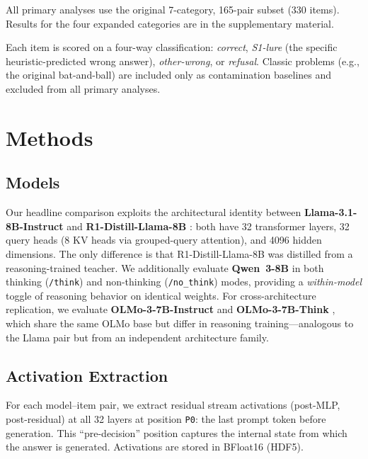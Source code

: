 \documentclass[accepted]{article}
\newcommand{\pzero}{\texttt{P0}}
\begin{document}
\noindent All primary analyses use the original 7-category,
165-pair subset (330 items).  Results for the four expanded categories
are in the supplementary material.

\noindent Each item is scored on a four-way classification: \emph{correct},
\emph{S1-lure} (the specific heuristic-predicted wrong answer),
\emph{other-wrong}, or \emph{refusal}.  Classic problems (e.g., the
original bat-and-ball) are included only as contamination baselines and
excluded from all primary analyses.


\section{Methods}
\label{sec:methods}

\subsection{Models}

Our headline comparison exploits the architectural identity between
\textbf{Llama-3.1-8B-Instruct} \citep{llama31} and
\textbf{R1-Distill-Llama-8B} \citep{deepseekr1}: both have 32
transformer layers, 32 query heads (8 KV heads via grouped-query
attention), and 4096 hidden dimensions.  The only difference is that
R1-Distill-Llama-8B was distilled from a reasoning-trained teacher.  We
additionally evaluate \textbf{Qwen~3-8B} in both thinking (\texttt{/think})
and non-thinking (\texttt{/no\_think}) modes, providing a
\emph{within-model} toggle of reasoning behavior on identical weights.
For cross-architecture replication, we evaluate
\textbf{OLMo-3-7B-Instruct} and \textbf{OLMo-3-7B-Think}
\citep{olmo3}, which share the same OLMo base but differ in reasoning
training---analogous to the Llama pair but from an independent
architecture family.

\subsection{Activation Extraction}

For each model--item pair, we extract residual stream activations
(post-MLP, post-residual) at all 32 layers at position \pzero{}: the
last prompt token before generation.  This ``pre-decision'' position
captures the internal state from which the answer is generated.
Activations are stored in BFloat16 (HDF5).
\end{document}
